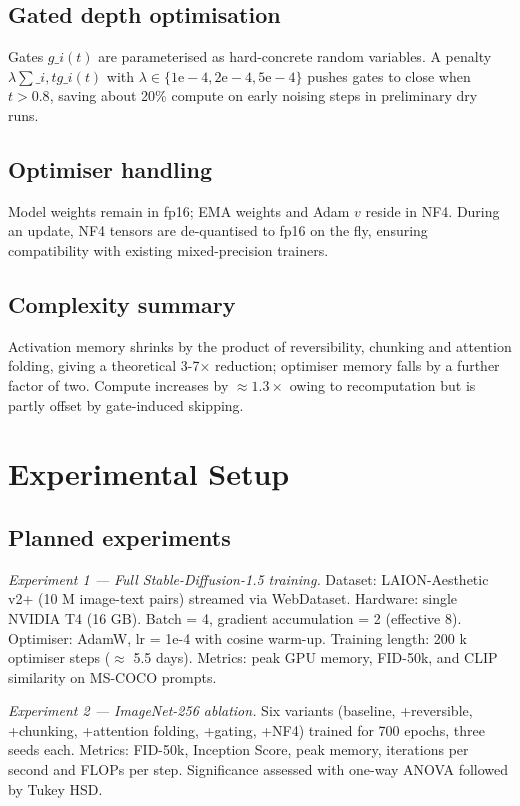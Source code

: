 \documentclass{article}
\begin{document}
\subsection{Gated depth optimisation}
Gates \(g\_i(t)\) are parameterised as hard-concrete random variables. A penalty \(\lambda \sum\_{i,t} g\_i(t)\) with \(\lambda \in \{1\mathrm{e}{-}4, 2\mathrm{e}{-}4, 5\mathrm{e}{-}4\}\) pushes gates to close when \(t > 0.8\), saving about 20\% compute on early noising steps in preliminary dry runs.

\subsection{Optimiser handling}
Model weights remain in fp16; EMA weights and Adam \(v\) reside in NF4. During an update, NF4 tensors are de-quantised to fp16 on the fly, ensuring compatibility with existing mixed-precision trainers.

\subsection{Complexity summary}
Activation memory shrinks by the product of reversibility, chunking and attention folding, giving a theoretical 3-7× reduction; optimiser memory falls by a further factor of two. Compute increases by \(\approx 1.3\times\) owing to recomputation but is partly offset by gate-induced skipping.

\section{Experimental Setup}
\subsection{Planned experiments}
\textit{Experiment 1 — Full Stable-Diffusion-1.5 training.} Dataset: LAION-Aesthetic v2+ (10 M image-text pairs) streamed via WebDataset. Hardware: single NVIDIA T4 (16 GB). Batch = 4, gradient accumulation = 2 (effective 8). Optimiser: AdamW, lr = 1e-4 with cosine warm-up. Training length: 200 k optimiser steps (\(\approx\) 5.5 days). Metrics: peak GPU memory, FID-50k, and CLIP similarity on MS-COCO prompts.

\textit{Experiment 2 — ImageNet-256 ablation.} Six variants (baseline, +reversible, +chunking, +attention folding, +gating, +NF4) trained for 700 epochs, three seeds each. Metrics: FID-50k, Inception Score, peak memory, iterations per second and FLOPs per step. Significance assessed with one-way ANOVA followed by Tukey HSD.
\end{document}
